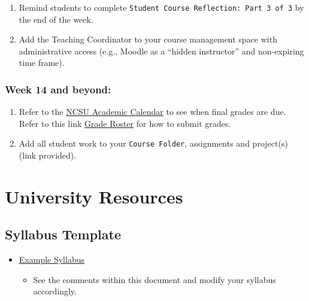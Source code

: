 \documentclass[
]{book}
\providecommand{\tightlist}{%
  \setlength{\itemsep}{0pt}\setlength{\parskip}{0pt}}
\begin{document}
\begin{enumerate}
\def\labelenumi{\arabic{enumi})}
\item
  Remind students to complete \texttt{Student\ Course\ Reflection:\ Part\ 3\ of\ 3} by the end of the week.
\item
  Add the Teaching Coordinator to your course management space with administrative access (e.g., Moodle as a ``hidden instructor'' and non-expiring time frame).
\end{enumerate}

\hypertarget{week-14-and-beyond}{%
\subsection{Week 14 and beyond:}\label{week-14-and-beyond}}

\begin{enumerate}
\def\labelenumi{\arabic{enumi})}
\item
  Refer to the \href{https://studentservices.ncsu.edu/calendars/academic/}{NCSU Academic Calendar} to see when final grades are due. Refer to this link \href{https://sis.emas.ncsu.edu/faculty/faculty-center/\#grades}{Grade Roster} for how to submit grades.
\item
  Add all student work to your \texttt{Course\ Folder}, assignments and project(s) (link provided).
\end{enumerate}

\hypertarget{university-resources}{%
\chapter{University Resources}\label{university-resources}}

\hypertarget{syllabus-template}{%
\section{Syllabus Template}\label{syllabus-template}}

\begin{itemize}
\tightlist
\item
  \href{https://docs.google.com/document/d/12w-byO3kEmP4ofI8GIuDAbXkEOA3hwqVGXz3qRbX-l4/edit?usp=sharing}{Example Syllabus}

  \begin{itemize}
  \tightlist
  \item
    See the comments within this document and modify your syllabus accordingly.
  \end{itemize}
\end{itemize}
\end{document}
